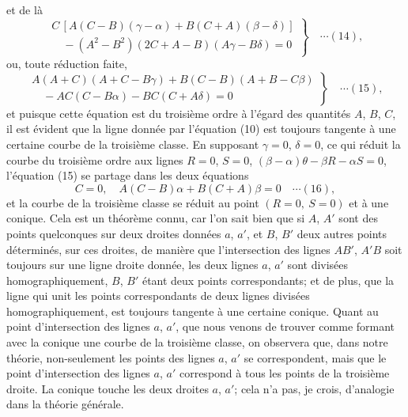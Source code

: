 \documentclass[12pt,a4paper]{article}
\begin{document}
\noindent et de l\`a
\[
\left.\begin{array}{l}
C\,[A(C - B)(\gamma - \alpha) + B(C + A)(\beta - \delta)]\\[2pt]
\quad - (A^2 - B^2)(2C + A - B)(A\gamma - B\delta) = 0
\end{array}\right\} \quad\cdots(14),
\]
ou, toute r\'eduction faite,
\[
\left.\begin{array}{l}
A(A + C)(A + C - B\gamma) + B(C - B)(A + B - C\beta)\\[2pt]
\quad - AC(C - B\alpha) - BC(C + A\delta) = 0
\end{array}\right\} \quad\cdots(15),
\]
et puisque cette \'equation est du troisi\`eme ordre \`a l'\'egard des quantit\'es $A$, $B$, $C$, il est \'evident que la ligne donn\'ee par l'\'equation (10) est toujours tangente \`a une certaine courbe de la troisi\`eme classe. En supposant $\gamma = 0$, $\delta = 0$, ce qui r\'eduit la courbe du troisi\`eme ordre aux lignes $R = 0$, $S = 0$, $(\beta - \alpha)\theta - \beta R - \alpha S = 0$, l'\'equation (15) se partage dans les deux \'equations
\[
C = 0,\quad A(C - B)\alpha + B(C + A)\beta = 0 \quad\cdots(16),
\]
et la courbe de la troisi\`eme classe se r\'eduit au point $(R = 0,\ S = 0)$ et \`a une conique. Cela est un th\'eor\`eme connu, car l'on sait bien que si $A$, $A'$ sont des points quelconques sur deux droites donn\'ees $a$, $a'$, et $B$, $B'$ deux autres points d\'etermin\'es, sur ces droites, de mani\`ere que l'intersection des lignes $AB'$, $A'B$ soit toujours sur une ligne droite donn\'ee, les deux lignes $a$, $a'$ sont divis\'ees homographiquement, $B$, $B'$ \'etant deux points correspondants; et de plus, que la ligne qui unit les points correspondants de deux lignes divis\'ees homographiquement, est toujours tangente \`a une certaine conique. Quant au point d'intersection des lignes $a$, $a'$, que nous venons de trouver comme formant avec la conique une courbe de la troisi\`eme classe, on observera que, dans notre th\'eorie, non-seulement les points des lignes $a$, $a'$ se correspondent, mais que le point d'intersection des lignes $a$, $a'$ correspond \`a tous les points de la troisi\`eme droite. La conique touche les deux droites $a$, $a'$; cela n'a pas, je crois, d'analogie dans la th\'eorie g\'en\'erale.

\newpage
\setcounter{page}{190}
\end{document}

